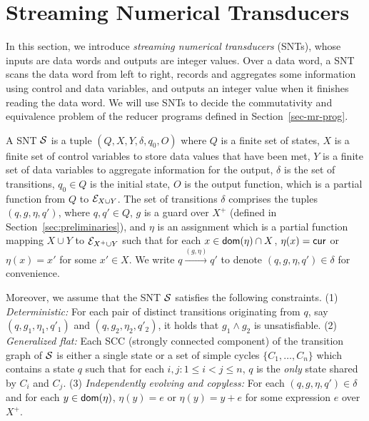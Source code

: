 


\section{Streaming Numerical Transducers}\label{sec:def-snt}

In this section, we introduce \emph{streaming numerical transducers} (SNTs), whose inputs are data words and outputs are integer values. Over a data word, a SNT scans the data word from left to right, records and aggregates some information using control and data variables, and outputs an integer value when it finishes reading the data word. We will use SNTs to decide the commutativity and equivalence problem of the reducer programs defined in Section~\ref{sec-mr-prog}.


A SNT ${\mathcal{S} }$ is a tuple $(Q, X, Y, \delta, q_0, O)$ where $Q$ is a finite set of states, $X$ is a finite set of control variables to store data values that have been met, $Y$ is a finite set of data variables to aggregate information for the output, $\delta$ is the set of transitions, $q_0 \in Q$ is the initial state, $O$ is the output function, which is a partial function from $Q$ to ${\mathcal{E} }_{X \cup Y}$.%
The set of transitions $\delta$ comprises the tuples $(q,  g, \eta, q')$, where $q,q'\in Q$, $g$ is a guard over $X^+$ (defined in Section~\ref{sec:preliminaries}), and $\eta$ is an assignment which is a partial function mapping $X \cup Y$  to ${\mathcal{E} }_{X^+ \cup Y}$ such that for each $x \in \mathsf{dom}(\eta) \cap X$, $\eta(x)=\mathsf{cur}$ or $\eta(x) = x'$ for some $x' \in X$. We write $q \xrightarrow{(g,\eta)} q'$ to denote $(q,g,\eta,q') \in \delta$ for convenience. 

Moreover, we assume that the SNT ${\mathcal{S} }$ satisfies the following constraints. (1) \emph{Deterministic:} For each pair of distinct transitions originating from $q$, say $(q, g_1, \eta_1,q'_1)$ and $(q, g_2,\eta_2,q'_2)$, it holds that $g_1 \wedge g_2$ is unsatisfiable. (2) \emph{Generalized flat:} Each SCC (strongly connected component) of the transition graph of ${\mathcal{S} }$ is either a single state or a set of simple cycles $\{C_1,\dots, C_n\}$ which contains a state $q$ such that for each $i,j: 1 \le i < j \le n$, $q$ is the \emph{only} state shared by $C_i$ and $C_j$. (3) \emph{Independently evolving and copyless:} For each $(q, g, \eta, q') \in \delta$ and for each $y \in \mathsf{dom}(\eta)$, $\eta(y)=e$ or $\eta(y)=y+e$ for some expression $e$ over $X^+$.

